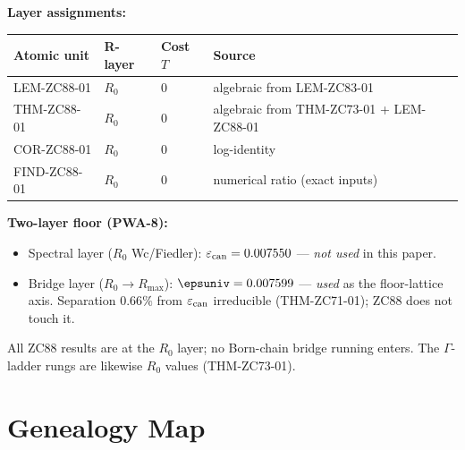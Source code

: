 \documentclass[12pt, a4paper]{article}
\renewcommand{\epscan}{\varepsilon_{\rm can}}   %
\begin{document}
\begin{layerbox}[title={R-Layer Assignments for ZC88}]

\textbf{Layer assignments:}

{\small\renewcommand{\arraystretch}{1.25}
\begin{center}
\begin{tabular}{@{}llll@{}}
\toprule
Atomic unit & R-layer & Cost $T$ & Source \\
\midrule
LEM-ZC88-01 & $R_0$ & $0$ & algebraic from LEM-ZC83-01 \\
THM-ZC88-01 & $R_0$ & $0$ & algebraic from THM-ZC73-01 + LEM-ZC88-01 \\
COR-ZC88-01 & $R_0$ & $0$ & log-identity \\
FIND-ZC88-01 & $R_0$ & $0$ & numerical ratio (exact inputs) \\
\bottomrule
\end{tabular}
\end{center}}

\textbf{Two-layer floor (PWA-8):}
\begin{itemize}[leftmargin=2em, noitemsep]
  \item Spectral layer ($R_0$ Wc/Fiedler): $\epscan=0.007550$ ---
    \emph{not used} in this paper.
  \item Bridge layer ($R_0{\to}R_{\max}$): $\epsuniv=0.007599$ ---
    \emph{used} as the floor-lattice axis. Separation $0.66\%$ from
    $\epscan$ irreducible (THM-ZC71-01); ZC88 does not touch it.
\end{itemize}

All ZC88 results are at the $R_0$ layer; no Born-chain bridge running
enters. The $\Gamma$-ladder rungs are likewise $R_0$ values (THM-ZC73-01).
\end{layerbox}

\section{Genealogy Map}
\label{sec:genealogy-zc88}
\end{document}
